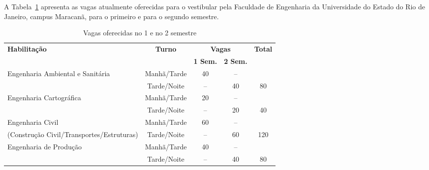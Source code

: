 A Tabela~\ref{tabvagas} apresenta as vagas atualmente oferecidas para o vestibular pela Faculdade de Engenharia da Universidade do Estado do Rio de Janeiro, campus Maracanã, para o primeiro e para o segundo semestre.
\begin{table}
	\centering
	\caption{Vagas oferecidas no 1\textordmasculine{} e no 2\textordmasculine{} semestre}
	\label{tabvagas}
	\begin{tabularx}{\textwidth}{|X|c|c|c|c|}
		\hline
		\multirow{2}{*}{\textbf{Habilitação}}                 & \multirow{2}{*}{\textbf{Turno}} & \multicolumn{2}{c|}{\textbf{Vagas}} & \multirow{2}{*}{\textbf{Total}}          \\
		\cline{3-4}                                           &                                 & \textbf{1\textordmasculine{} Sem.}  & \textbf{2\textordmasculine{} Sem.} &     \\
		\hline
		Engenharia Ambiental e Sanitária                      & Manhã/Tarde                     & 40                                  & --                                 &     \\
		                                                      & Tarde/Noite                     & --                                  & 40                                 & 80  \\
		\hline
		Engenharia Cartográfica                               & Manhã/Tarde                     & 20                                  & --                                 &     \\
		                                                      & Tarde/Noite                     & --                                  & 20                                 & 40  \\
		\hline
		Engenharia Civil                                      & Manhã/Tarde                     & 60                                  & --                                 &     \\
		(Construção Civil/Transportes/Estruturas)             & Tarde/Noite                     & --                                  & 60                                 & 120 \\
		\hline
		Engenharia de Produção                                & Manhã/Tarde                     & 40                                  & --                                 &     \\
		                                                      & Tarde/Noite                     & --                                  & 40                                 & 80  \\

\end{tabularx}
\end{table}

